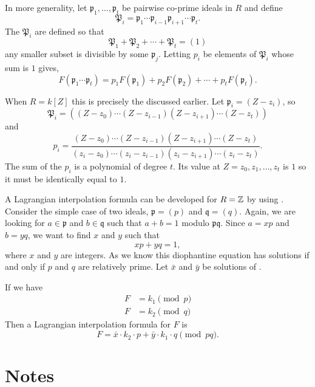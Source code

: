 In more generality, let $\mathfrak{p}_1, \ldots, \mathfrak{p}_t$ be pairwise
co-prime ideals in $R$ and define
\[
\mathfrak{P}_i = \mathfrak{p}_1 \cdots \mathfrak{p}_{i-1} \mathfrak{p}_{i+1}
\cdots \mathfrak{p}_t.
\]
The $\mathfrak{P}_i$ are defined so that 
\[
\mathfrak{P}_1 + \mathfrak{P}_2 + \cdots + \mathfrak{P}_t = (1)
\]
any smaller subset is divisible by some $\mathfrak{p}_j$.  Letting $p_i$
be elements of $\mathfrak{P}_i$ whose sum is $1$ gives,
\begin{equation}\label{CRA:Lagrange:Eq}
F(\mathfrak{p}_1 \cdots \mathfrak{p}_t) = 
 p_1 F(\mathfrak{p}_1) + p_2 F(\mathfrak{p}_2) + \cdots +
  p_t F(\mathfrak{p}_t).
\end{equation}

When $R = k[Z]$ this is precisely the  discussed earlier.  Let $\mathfrak{p}_i = (Z - z_i)$, so
\[
\mathfrak{P}_i = \left((Z - z_0) \cdots (Z-z_{i-1})(Z-z_{i+1}) \cdots
(Z-z_t)\right)
\]
and
\[
p_i = \frac{(Z-z_0)\cdots(Z - z_{i-1})(Z - z_{i+1}) \cdots (Z-z_t)}{(z_i-z_0)\cdots(z_i - z_{i-1})(z_i - z_{i+1}) \cdots (z_i-z_t)}.
\]
The sum of the $p_i$ is a polynomial of degree $t$.  Its value at $Z =
z_0, z_1, \ldots, z_t$ is $1$ so it must be identically equal to $1$.

A Lagrangian interpolation formula can be developed for $R = \mathbb{Z}$ by
using .  Consider the simple case of two
ideals, $\mathfrak{p} = (p)$ and $\mathfrak{q} = (q)$.  Again, we are
looking for $a \in \mathfrak{p}$ and $b \in \mathfrak{q}$ such that $a+b =
1$ modulo $\mathfrak{pq}$.  Since  $a = xp$ and $b = yq$, we want to find
$x$ and $y$ such that 
\begin{equation} \label{Abs:Dio:Eq}
xp + yq = 1,
\end{equation}
where $x$ and $y$ are integers.  As we know this diophantine equation
has solutions if and only if $p$ and $q$ are relatively prime.  Let
$\bar{x}$ and $\bar{y}$ be solutions of .

If we have
\[
\begin{aligned}
F &= k_1 \pmod{p} \\
F &= k_2 \pmod{q}
\end{aligned}
\]
Then a Lagrangian interpolation formula for $F$ is
\[
F = \bar{x} \cdot  k_2 \cdot p + \bar{y} \cdot k_1 \cdot q \pmod{pq}.
\]

\section*{Notes}

